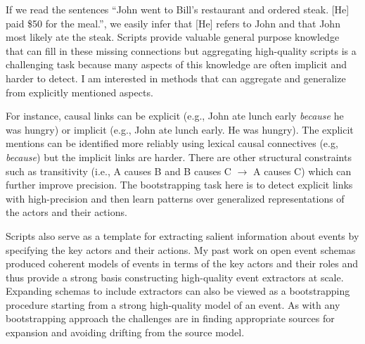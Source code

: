 \documentclass[a4paper,11pt,onecolumn]{article}
\begin{document}
If we read the sentences ``John went to Bill's restaurant and ordered steak. [He] paid \$50 for the meal.'', we easily infer that [He] refers to John and that John most likely ate the steak. Scripts provide valuable general purpose knowledge that can fill in these missing connections but aggregating high-quality scripts is a challenging task because many aspects of this knowledge are often implicit and harder to detect. I am interested in methods that can aggregate and generalize from explicitly mentioned aspects. 

For instance, causal links can be explicit (e.g., John ate lunch early {\em because} he was hungry) or implicit (e.g., John ate lunch early. He was hungry). The explicit mentions can be identified more reliably using lexical causal connectives (e.g, {\em because})  but the implicit links are harder. There are other structural constraints such as transitivity (i.e., A causes B and B causes C $\rightarrow$ A causes C) which can further improve precision. The bootstrapping task here is to detect explicit links with high-precision and then learn patterns over generalized representations of the actors and their actions. 



Scripts also serve as a template for extracting salient information about events by specifying the key actors and their actions. My past work on open event schemas produced coherent models of events in terms of the key actors and their roles and thus provide a strong basis constructing high-quality event extractors at scale. Expanding schemas to include extractors can also be viewed as a bootstrapping procedure starting from a strong high-quality model of an event. As with any bootstrapping approach the challenges are in finding appropriate sources for expansion and avoiding drifting from the source model. 
\end{document}
